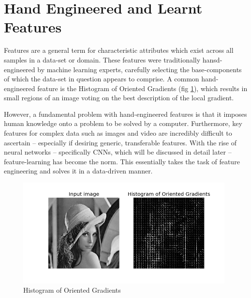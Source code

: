 \documentclass{report}
\begin{document}
	\section{Hand Engineered and Learnt Features} \label{hand-eng:1}
	Features are a general term for characteristic attributes which exist across all samples in a data-set or domain. These features were traditionally hansd-engineered by machine learning experts, carefully selecting the base-components of which the data-set in question appears to comprise. A common hand-engineered feature is the Histogram of Oriented Gradients (fig \ref{fig:hog:1}), which results in small regions of an image voting on the best description of the local gradient. \par
	However, a fundamental problem with hand-engineered features is that it imposes human knowledge onto a problem to be solved by a computer. Furthermore, key features for complex data such as images and video are incredibly difficult to ascertain -- especially if desiring generic, transferable features. With the rise of neural networks -- specifically CNNs, which will be discussed in detail later -- feature-learning has become the norm. This essentially takes the task of feature engineering and solves it in a data-driven manner. \par
	\begin{figure}[!h]
		\centering
		\includegraphics[width=11cm]{hog}
		\caption{Histogram of Oriented Gradients}
		\label{fig:hog:1}
	\end{figure}
\end{document}
